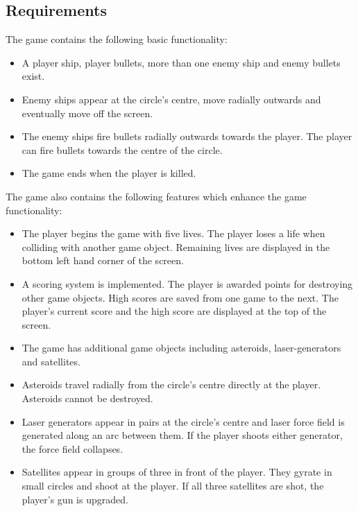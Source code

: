 \documentclass[10pt,twocolumn]{witseiepaper}
\begin{document}
\subsection{Requirements}\label{functionlity_requirements}

The game contains the following basic functionality:

\begin{itemize}
	\item A player ship, player bullets, more than one enemy ship and enemy bullets exist.
	\item Enemy ships appear at the circle's centre, move radially outwards and eventually move off the screen. 
	\item The enemy ships fire bullets radially outwards towards the player. The player can fire bullets towards the centre of the circle.
	\item The game ends when the player is killed.
\end{itemize}

The game also contains the following features which enhance the game functionality:

\begin{itemize}
	\item The player begins the game with five lives. The player loses a life when colliding with another game object. Remaining lives are displayed in the bottom left hand corner of the screen.
	\item A scoring system is implemented. The player is awarded points for destroying other game objects. High scores are saved from one game to the next. The player's current score and the high score are displayed at the top of the screen.
	\item The game has additional game objects including asteroids, laser-generators and satellites.
	\item Asteroids travel radially from the circle's centre directly at the player. Asteroids cannot be destroyed.
	\item Laser generators appear in pairs at the circle's centre and laser force field is generated along an arc between them. If the player shoots either generator, the force field collapses.
	\item Satellites appear in groups of three in front of the player. They gyrate in small circles and shoot at the player. If all three satellites are shot, the player's gun is upgraded.
	
\end{itemize}
\end{document}
